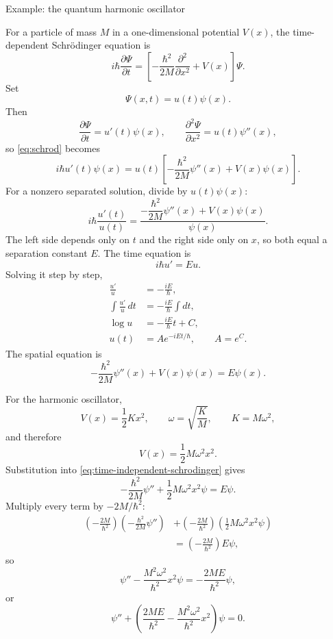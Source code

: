 \documentclass[11pt]{beamer}
\begin{document}
\begin{frame}[allowframebreaks]{Example: the quantum harmonic oscillator}
\footnotesize

For a particle of mass $M$ in a one-dimensional potential $V(x)$, the
time-dependent Schr\"odinger equation is
\begin{equation}
  i\hbar\frac{\partial\Psi}{\partial t}
   =
  \left[
    -\frac{\hbar^2}{2M}\frac{\partial^2}{\partial x^2}
    +V(x)
  \right]\Psi.
  \label{eq:schrod}
\end{equation}
Set
\[
  \Psi(x,t)=u(t)\psi(x).
\]
Then
\[
  \frac{\partial\Psi}{\partial t}=u'(t)\psi(x),
  \qquad
  \frac{\partial^2\Psi}{\partial x^2}=u(t)\psi''(x),
\]
so \eqref{eq:schrod} becomes
\[
  i\hbar u'(t)\psi(x)
   =
  u(t)\left[
    -\frac{\hbar^2}{2M}\psi''(x)+V(x)\psi(x)
  \right].
\]
For a nonzero separated solution, divide by $u(t)\psi(x)$:
\[
  i\hbar\frac{u'(t)}{u(t)}
   =
  \frac{-\dfrac{\hbar^2}{2M}\psi''(x)+V(x)\psi(x)}
       {\psi(x)}.
\]
The left side depends only on $t$ and the right side only on $x$, so both equal
a separation constant $E$.  The time equation is
\[
  i\hbar u'=Eu.
\]
Solving it step by step,
\begin{align*}
  \frac{u'}{u}
   &=-\frac{iE}{\hbar},\\
  \int\frac{u'}{u}\,dt
   &=-\frac{iE}{\hbar}\int dt,\\
  \log u
   &=-\frac{iE}{\hbar}t+C,\\
  u(t)
   &=Ae^{-iEt/\hbar},
  \qquad A=e^C.
\end{align*}
The spatial equation is
\begin{equation}
  -\frac{\hbar^2}{2M}\psi''(x)+V(x)\psi(x)=E\psi(x).
  \label{eq:time-independent-schrodinger}
\end{equation}

For the harmonic oscillator,
\[
  V(x)=\frac12Kx^2,
  \qquad
  \omega=\sqrt{\frac{K}{M}},
  \qquad
  K=M\omega^2,
\]
and therefore
\[
  V(x)=\frac12M\omega^2x^2.
\]
Substitution into \eqref{eq:time-independent-schrodinger} gives
\[
  -\frac{\hbar^2}{2M}\psi''
  +\frac12M\omega^2x^2\psi=E\psi.
\]
Multiply every term by $-2M/\hbar^2$:
\begin{align*}
  \left(-\frac{2M}{\hbar^2}\right)
  \left(-\frac{\hbar^2}{2M}\psi''\right)
   &+
  \left(-\frac{2M}{\hbar^2}\right)
  \left(\frac12M\omega^2x^2\psi\right)\\
   &=
  \left(-\frac{2M}{\hbar^2}\right)E\psi,
\end{align*}
so
\[
  \psi''
  -\frac{M^2\omega^2}{\hbar^2}x^2\psi
  =-\frac{2ME}{\hbar^2}\psi,
\]
or
\[
  \psi''
  +\left(
    \frac{2ME}{\hbar^2}
    -\frac{M^2\omega^2}{\hbar^2}x^2
  \right)\psi=0.
\]


\end{frame}
\end{document}

